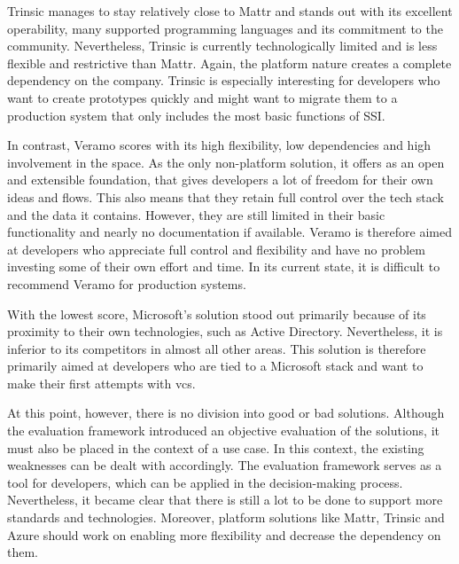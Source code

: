     Trinsic manages to stay relatively close to Mattr and stands out with its excellent operability, many supported programming languages and its commitment to the community. Nevertheless, Trinsic is currently technologically limited and is less flexible and restrictive than Mattr. Again, the platform nature creates a complete dependency on the company. Trinsic is especially interesting for developers who want to create prototypes quickly and might want to migrate them to a production system that only includes the most basic functions of \ac{SSI}.
    
    In contrast, Veramo scores with its high flexibility, low dependencies and high involvement in the space. As the only non-platform solution, it offers as an open and extensible foundation, that gives developers a lot of freedom for their own ideas and flows. This also means that they retain full control over the tech stack and the data it contains. However, they are still limited in their basic functionality and nearly no documentation if available. Veramo is therefore aimed at developers who appreciate full control and flexibility and have no problem investing some of their own effort and time. In its current state, it is difficult to recommend Veramo for production systems.
    
    With the lowest score, Microsoft's solution stood out primarily because of its proximity to their own technologies, such as Active Directory. Nevertheless, it is inferior to its competitors in almost all other areas. This solution is therefore primarily aimed at developers who are tied to a Microsoft stack and want to make their first attempts with \acp{vc}.
    
    At this point, however, there is no division into good or bad solutions. Although the evaluation framework introduced an objective evaluation of the solutions, it must also be placed in the context of a use case. In this context, the existing weaknesses can be dealt with accordingly. The evaluation framework serves as a tool for developers, which can be applied in the decision-making process. Nevertheless, it became clear that there is still a lot to be done to support more standards and technologies. Moreover, platform solutions like Mattr, Trinsic and Azure should work on enabling more flexibility and decrease the dependency on them.
	
	
	
	
